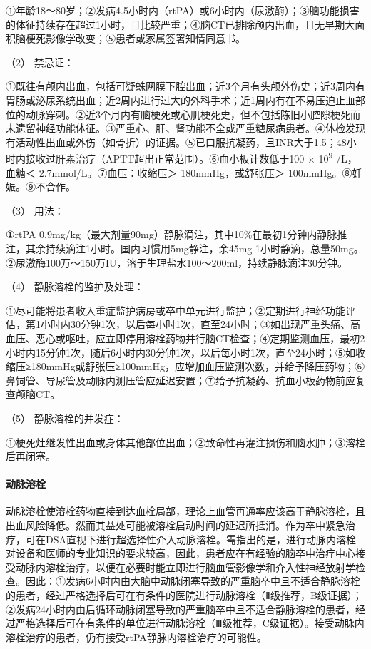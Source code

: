 ①年龄18～80岁；②发病4.5小时内（rtPA）或6小时内（尿激酶）；③脑功能损害的体征持续存在超过1小时，且比较严重；④脑CT已排除颅内出血，且无早期大面积脑梗死影像学改变；⑤患者或家属签署知情同意书。

\hypertarget{text00242.htmlux5cux23CHP8-1-2-3-4-1-1-2}{}
（2） 禁忌证：

①既往有颅内出血，包括可疑蛛网膜下腔出血；近3个月有头颅外伤史；近3周内有胃肠或泌尿系统出血；近2周内进行过大的外科手术；近1周内有在不易压迫止血部位的动脉穿刺。②近3个月内有脑梗死或心肌梗死史，但不包括陈旧小腔隙梗死而未遗留神经功能体征。③严重心、肝、肾功能不全或严重糖尿病患者。④体检发现有活动性出血或外伤（如骨折）的证据。⑤已口服抗凝药，且INR大于1.5；48小时内接收过肝素治疗（APTT超出正常范围）。⑥血小板计数低于100
× 10\textsuperscript{9} /L，血糖＜ 2.7mmol/L。⑦血压：收缩压＞
180mmHg，或舒张压＞ 100mmHg。⑧妊娠。⑨不合作。

\hypertarget{text00242.htmlux5cux23CHP8-1-2-3-4-1-1-3}{}
（3） 用法：

①rtPA
0.9mg/kg（最大剂量90mg）静脉滴注，其中10\%在最初1分钟内静脉推注，其余持续滴注1小时。国内习惯用5mg静注，余45mg
1小时静滴，总量50mg。②尿激酶100万～150万IU，溶于生理盐水100～200ml，持续静脉滴注30分钟。

\hypertarget{text00242.htmlux5cux23CHP8-1-2-3-4-1-1-4}{}
（4） 静脉溶栓的监护及处理：

①尽可能将患者收入重症监护病房或卒中单元进行监护；②定期进行神经功能评估，第1小时内30分钟1次，以后每小时1次，直至24小时；③如出现严重头痛、高血压、恶心或呕吐，应立即停用溶栓药物并行脑CT检查；④定期监测血压，最初2小时内15分钟1次，随后6小时内30分钟1次，以后每小时1次，直至24小时；⑤如收缩压≥180mmHg或舒张压≥100mmHg，应增加血压监测次数，并给予降压药物；⑥鼻饲管、导尿管及动脉内测压管应延迟安置；⑦给予抗凝药、抗血小板药物前应复查颅脑CT。

\hypertarget{text00242.htmlux5cux23CHP8-1-2-3-4-1-1-5}{}
（5） 静脉溶栓的并发症：

①梗死灶继发性出血或身体其他部位出血；②致命性再灌注损伤和脑水肿；③溶栓后再闭塞。

\paragraph{动脉溶栓}

动脉溶栓使溶栓药物直接到达血栓局部，理论上血管再通率应该高于静脉溶栓，且出血风险降低。然而其益处可能被溶栓启动时间的延迟所抵消。作为卒中紧急治疗，可在DSA直视下进行超选择性介入动脉溶栓。需指出的是，进行动脉内溶栓对设备和医师的专业知识的要求较高，因此，患者应在有经验的脑卒中治疗中心接受动脉内溶栓治疗，以便在必要时能立即进行脑血管影像学和介入性神经放射学检查。因此：①发病6小时内由大脑中动脉闭塞导致的严重脑卒中且不适合静脉溶栓的患者，经过严格选择后可在有条件的医院进行动脉溶栓（Ⅱ级推荐，B级证据）；②发病24小时内由后循环动脉闭塞导致的严重脑卒中且不适合静脉溶栓的患者，经过严格选择后可在有条件的单位进行动脉溶栓（Ⅲ级推荐，C级证据）。接受动脉内溶栓治疗的患者，仍有接受rtPA静脉内溶栓治疗的可能性。

